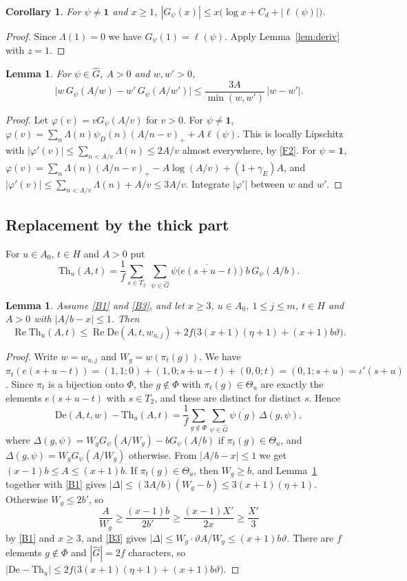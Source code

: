 \documentclass[11pt]{amsart}
\newcommand{\re}{\operatorname{Re}}
\newcommand{\gE}{\gamma_{E}}
\newcommand{\De}{\mathrm{De}}
\newcommand{\Th}{\mathrm{Th}}
\newcommand{\Gh}{\widehat{G}}
\newcommand{\pa}{\pi}
\theoremstyle{plain}
\newtheorem{lemma}[theorem]{Lemma}
\newtheorem{corollary}[theorem]{Corollary}
\theoremstyle{definition}
\numberwithin{equation}{section}
\begin{document}
\begin{corollary}\label{cor:triv}
For $\psi\neq\mathbf 1$ and $x\ge1$, $|G_\psi(x)|\le x\bigl(\log x+C_d+|\ell(\psi)|\bigr)$.
\end{corollary}

\begin{proof}
Since $\Lambda(1)=0$ we have $G_\psi(1)=\ell(\psi)$. Apply Lemma~\ref{lem:deriv} with $z=1$.
\end{proof}

\begin{lemma}\label{lem:lip}
For $\psi\in\Gh$, $A>0$ and $w,w'>0$,
\[
\bigl|w\,G_\psi(A/w)-w'\,G_\psi(A/w')\bigr|\le\frac{3A}{\min(w,w')}\,|w-w'|.
\]
\end{lemma}

\begin{proof}
Let $\varphi(v)=vG_\psi(A/v)$ for $v>0$. For $\psi\neq\mathbf 1$,
$\varphi(v)=\sum_n\Lambda(n)\psi_D(n)(A/n-v)_++A\ell(\psi)$. This is locally Lipschitz with
$|\varphi'(v)|\le\sum_{n<A/v}\Lambda(n)\le2A/v$ almost everywhere, by \ref{F2}. For
$\psi=\mathbf 1$, $\varphi(v)=\sum_n\Lambda(n)(A/n-v)_+-A\log(A/v)+(1+\gE)A$, and
$|\varphi'(v)|\le\sum_{n<A/v}\Lambda(n)+A/v\le3A/v$. Integrate $|\varphi'|$ between $w$ and $w'$.
\end{proof}

\subsection{Replacement by the thick part}

For $u\in A_0$, $t\in H$ and $A>0$ put
\[
\Th_u(A,t)=\frac1f\sum_{s\in T_2}\ \sum_{\psi\in\Gh}\overline{\psi\bigl(e(s+u-t)\bigr)}\;b\,G_\psi(A/b).
\]

\begin{lemma}\label{lem:thick}
Assume \ref{B1} and \ref{B3}, and let $x\ge3$, $u\in A_0$, $1\le j\le m$, $t\in H$ and $A>0$ with
$|A/b-x|\le1$. Then
\[
\re\Th_u(A,t)\le\re\De(A,t,w_{u,j})+2f\bigl(3(x+1)(\eta+1)+(x+1)b\vartheta\bigr).
\]
\end{lemma}

\begin{proof}
Write $w=w_{u,j}$ and $W_g=w(\pa_t(g))$. We have
$\pa_t(e(s+u-t))=(1,1;0)+(1,0;s+u-t)+(0,0;t)=(0,1;s+u)=\iota'(s+u)$. Since $\pa_t$ is a bijection
onto $\Phi$, the $g\notin\Phi$ with $\pa_t(g)\in\Theta_u$ are exactly the elements $e(s+u-t)$ with
$s\in T_2$, and these are distinct for distinct $s$. Hence
\[
\De(A,t,w)-\Th_u(A,t)=\frac1f\sum_{g\notin\Phi}\sum_{\psi\in\Gh}\overline{\psi(g)}\,\Delta(g,\psi),
\]
where $\Delta(g,\psi)=W_gG_\psi(A/W_g)-bG_\psi(A/b)$ if $\pa_t(g)\in\Theta_u$, and
$\Delta(g,\psi)=W_gG_\psi(A/W_g)$ otherwise. From $|A/b-x|\le1$ we get $(x-1)b\le A\le(x+1)b$. If
$\pa_t(g)\in\Theta_u$, then $W_g\ge b$, and Lemma~\ref{lem:lip} together with \ref{B1} gives
$|\Delta|\le(3A/b)(W_g-b)\le3(x+1)(\eta+1)$. Otherwise $W_g\le2b'$, so
\[
\frac{A}{W_g}\ge\frac{(x-1)b}{2b'}\ge\frac{(x-1)X'}{2x}\ge\frac{X'}3
\]
by \ref{B1} and $x\ge3$, and \ref{B3} gives $|\Delta|\le W_g\cdot\vartheta A/W_g\le(x+1)b\vartheta$.
There are $f$ elements $g\notin\Phi$ and $|\Gh|=2f$ characters, so
$|\De-\Th_u|\le2f\bigl(3(x+1)(\eta+1)+(x+1)b\vartheta\bigr)$.
\end{proof}
\end{document}
